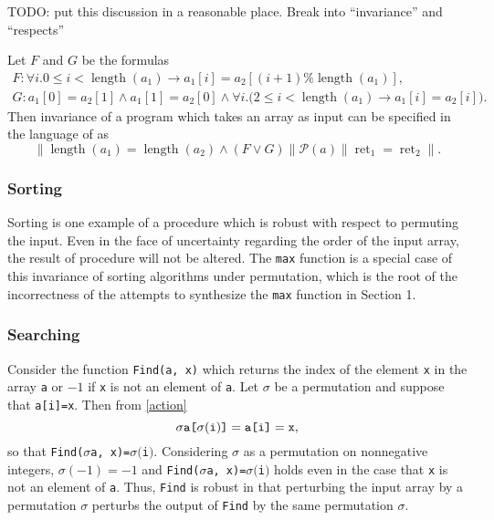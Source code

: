 \documentclass{llncs}
\DeclareMathOperator{\len}{length}
\DeclareMathOperator{\ret}{ret}
\begin{document}
    TODO: put this discussion in a reasonable place.
    Break into ``invariance'' and ``respects''

    Let \(F\) and \(G\) be the formulas
    \begin{gather*}
        F:  \forall i. 0 \leq i < \len(a_{1}) \rightarrow a_{1}[i] = a_{2}[(i+1)\%\len(a_{1})],\\
            G: a_{1}[0] = a_{2}[1] \wedge a_{1}[1] = a_{2}[0] \wedge 
              \forall i.\big( 2 \leq i < \len(a_{1}) \rightarrow a_{1}[i] = a_{2}[i] \big).
    \end{gather*}
    Then invariance of a program which takes an array as input can be specified
    in the language of \cite{sousa16} as
    \[
      \|\len(a_{1}) = \len(a_{2}) \wedge (F \vee G)\| 
        \mathcal{P}(a) \|\ret_{1} = \ret_{2}\|.
    \]

  \subsubsection{Sorting}

    Sorting is one example of a procedure which is robust with respect to permuting
    the input.  Even in the face of uncertainty regarding the order of the input
    array, the result of procedure will not be altered.  The \verb!max! function is
    a special case of this invariance of sorting algorithms under permutation, which
    is the root of the incorrectness of the attempts to synthesize the \verb!max!
    function in Section 1.

  \subsubsection{Searching}

    Consider the function \verb!Find(a, x)! which returns the index of the element
    \verb!x! in the array \verb!a! or \(-1\) if \verb!x! is not an element of
    \verb!a!.  Let \(\sigma\) be a permutation and suppose that \verb!a[i]=x!.  Then
    from \eqref{action} \[\sigma\verb!a[!\sigma(\verb!i!)\verb!]! = \verb!a[i]! =
    \verb!x!,\] so that \verb!Find(!\(\sigma\)\verb!a, x)=!\(\sigma(\)\verb!i!\()\).
    Considering \(\sigma\) as a permutation on nonnegative integers, \(\sigma(-1) =
    -1\) and \verb!Find(!\(\sigma\)\verb!a, x)=!\(\sigma(\)\verb!i!\()\) holds even
    in the case that \verb!x! is not an element of \verb!a!.  Thus, \verb!Find! is
    robust in that perturbing the input array by a permutation \(\sigma\) perturbs
    the output of \verb!Find! by the same permutation \(\sigma\).
\end{document}
